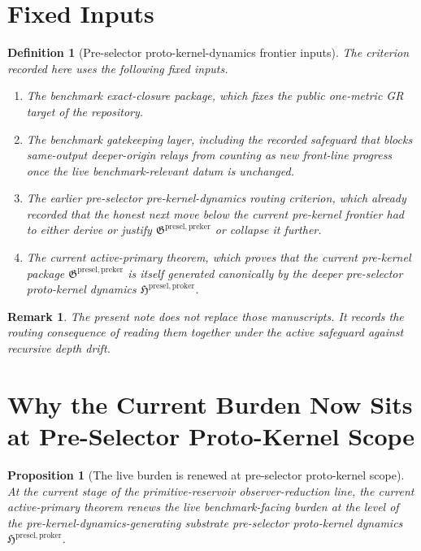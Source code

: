 \documentclass[11pt]{article}
\newcommand{\ProtoKernelPackage}{\mathfrak H^{\mathrm{presel,proker}}}
\newcommand{\PreKernelPackage}{\mathfrak G^{\mathrm{presel,preker}}}
\newtheorem{definition}{Definition}
\newtheorem{proposition}{Proposition}
\newtheorem{remark}{Remark}
\begin{document}
\section{Fixed Inputs}

\begin{definition}[Pre-selector proto-kernel-dynamics frontier inputs]
The criterion recorded here uses the following fixed inputs.
\begin{enumerate}
    \item The benchmark exact-closure package, which fixes the public one-metric GR target of the repository.
    \item The benchmark gatekeeping layer, including the recorded safeguard that blocks same-output deeper-origin relays from counting as new front-line progress once the live benchmark-relevant datum is unchanged.
    \item The earlier pre-selector pre-kernel-dynamics routing criterion, which already recorded that the honest next move below the current pre-kernel frontier had to either derive or justify \(\PreKernelPackage\) or collapse it further.
    \item The current active-primary theorem, which proves that the current pre-kernel package \(\PreKernelPackage\) is itself generated canonically by the deeper pre-selector proto-kernel dynamics \(\ProtoKernelPackage\).
\end{enumerate}
\end{definition}

\begin{remark}
The present note does not replace those manuscripts. It records the routing consequence of reading them together under the active safeguard against recursive depth drift.
\end{remark}

\section{Why the Current Burden Now Sits at Pre-Selector Proto-Kernel Scope}

\begin{proposition}[The live burden is renewed at pre-selector proto-kernel scope]
At the current stage of the primitive-reservoir observer-reduction line, the current active-primary theorem renews the live benchmark-facing burden at the level of the pre-kernel-dynamics-generating substrate pre-selector proto-kernel dynamics \(\ProtoKernelPackage\).
\end{proposition}
\end{document}
